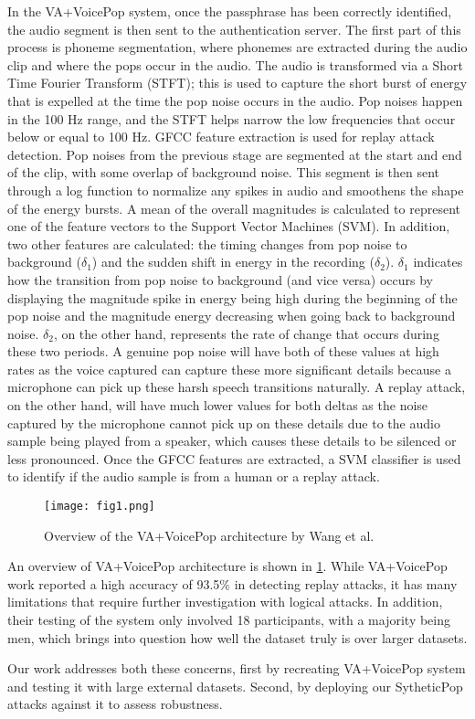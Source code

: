 In the VA+VoicePop system, once the passphrase has been correctly identified, the audio segment is then sent to the authentication server. The first part of this process is phoneme segmentation, where phonemes are extracted during the audio clip and where the pops occur in the audio. The audio is transformed via a Short Time Fourier Transform (STFT); this is used to capture the short burst of energy that is expelled at the time the pop noise occurs in the audio. Pop noises happen in the 100 Hz range, and the STFT helps narrow the low frequencies that occur below or equal to 100 Hz. GFCC feature extraction is used for replay attack detection. Pop noises from the previous stage are segmented at the start and end of the clip, with some overlap of background noise. This segment is then sent through a log function to normalize any spikes in audio and smoothens the shape of the energy bursts. A mean of the overall magnitudes is calculated to represent one of the feature vectors to the Support Vector Machines (SVM). In addition, two other features are calculated: the timing changes from pop noise to background ($\delta_1$) and the sudden shift in energy in the recording ($\delta_2$). $\delta_1$  indicates how the transition from pop noise to background (and vice versa) occurs by displaying the magnitude spike in energy being high during the beginning of the pop noise and the magnitude energy decreasing when going back to background noise. $\delta_2$, on the other hand, represents the rate of change that occurs during these two periods. A genuine pop noise will have both of these values at high rates as the voice captured can capture these more significant details because a microphone can pick up these harsh speech transitions naturally. A replay attack, on the other hand, will have much lower values for both deltas as the noise captured by the microphone cannot pick up on these details due to the audio sample being played from a speaker, which causes these details to be silenced or less pronounced. Once the GFCC features are extracted, a SVM classifier is used to identify if the audio sample is from a human or a replay attack.


\begin{figure}[htbp]
\centerline{\texttt{[image: fig1.png]}}
\caption{Overview of the VA+VoicePop architecture by Wang et al. \cite{b2}}
\label{fig:1}
\end{figure}



An overview of VA+VoicePop architecture is shown in \ref{fig:1}. While VA+VoicePop work reported a high accuracy of 93.5\% in detecting replay attacks, it has many limitations that require further investigation with logical attacks. In addition, their testing of the system only involved 18 participants, with a majority being men, which brings into question how well the dataset truly is over larger datasets. 

Our work addresses both these concerns, first by recreating VA+VoicePop system and testing it with large external datasets. Second, by deploying our SytheticPop attacks against it to assess robustness.